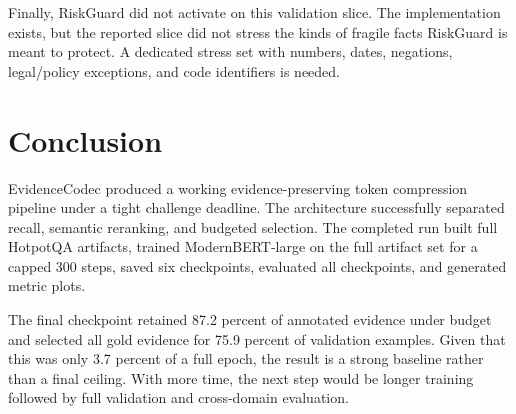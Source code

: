 \documentclass[10pt,twocolumn]{article}
\begin{document}
Finally, RiskGuard did not activate on this validation slice. The implementation exists, but the reported slice did not stress the kinds of fragile facts RiskGuard is meant to protect. A dedicated stress set with numbers, dates, negations, legal/policy exceptions, and code identifiers is needed.

\section{Conclusion}
EvidenceCodec produced a working evidence-preserving token compression pipeline under a tight challenge deadline. The architecture successfully separated recall, semantic reranking, and budgeted selection. The completed run built full HotpotQA artifacts, trained ModernBERT-large on the full artifact set for a capped 300 steps, saved six checkpoints, evaluated all checkpoints, and generated metric plots.

The final checkpoint retained 87.2 percent of annotated evidence under budget and selected all gold evidence for 75.9 percent of validation examples. Given that this was only 3.7 percent of a full epoch, the result is a strong baseline rather than a final ceiling. With more time, the next step would be longer training followed by full validation and cross-domain evaluation.
\end{document}
